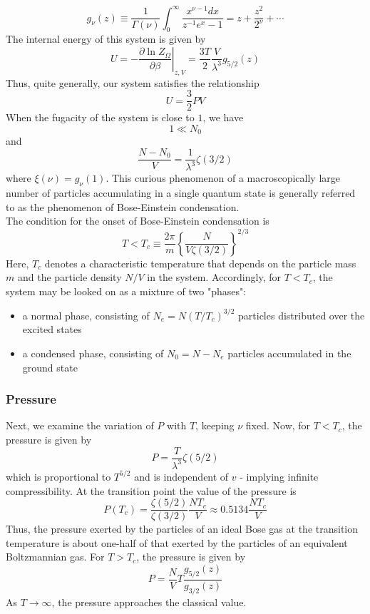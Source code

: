 $$g_{\nu}(z) \equiv \frac{1}{\Gamma(\nu)} \int_{0}^{\infty} \frac{x^{\nu-1}dx}{z^{-1}e^x -1} = z + \frac{z^2}{2^{\nu}} + \cdots$$
The internal energy of this system is given by
$$U = - \left. \frac{\partial \ln Z_{\Omega}}{\partial \beta} \right|_{z,V} = \frac{3T}{2} \frac{V}{\lambda^3} g_{5/2}(z)$$
Thus, quite generally, our system satisfies the relationship
$$U = \frac{3}{2}PV$$
When the fugacity of the system is close to $1$, we have 
$$1 \ll N_0$$
and
$$\frac{N - N_0}{V} = \frac{1}{\lambda^3}\zeta(3/2) $$ where $\xi(\nu) = g_{\nu}(1)$.
This curious phenomenon of a macroscopically large number of particles accumulating in a single quantum state is generally referred to as the phenomenon of Bose-Einstein condensation.
\\
The condition for the onset of Bose-Einstein condensation is
$$T < T_c \equiv \frac{2\pi}{m} \left\{ \frac{N}{V\zeta(3/2)} \right\}^{2/3}$$
Here, $T_c$ denotes a characteristic temperature that depends on the particle mass $m$ and the particle density $N/V$ in the system. Accordingly, for $T < T_c$, the system may be looked on as a mixture of two "phases":
\begin{itemize}
\item a normal phase, consisting of $N_e = N(T/T_c)^{3/2}$ particles distributed over the excited states
\item a condensed phase, consisting of $N_0 = N - N_e$ particles accumulated in the ground state
\end{itemize}

\subsubsection{Pressure}
Next, we examine the variation of $P$ with $T$, keeping $\nu$ fixed. Now, for $T < T_c$, the pressure is given by
$$P = \frac{T}{\lambda^3}\zeta(5/2)$$
which is proportional to $T^{5/2}$ and is independent of $v$ - implying infinite compressibility.
At the transition point the value of the pressure is
$$P(T_c) = \frac{\zeta(5/2)}{\zeta(3/2)} \frac{NT_c}{V} \approx 0.5134 \frac{NT_c}{V}$$
Thus, the pressure exerted by the particles of an ideal Bose gas at the transition temperature is about one-half of that exerted by the particles of an equivalent Boltzmannian gas. For $T > T_c$, the pressure is given by
$$P = \frac{N}{V}T \frac{g_{5/2}(z)}{g_{3/2}(z)}$$
As $T \to \infty$, the pressure approaches the classical value.

